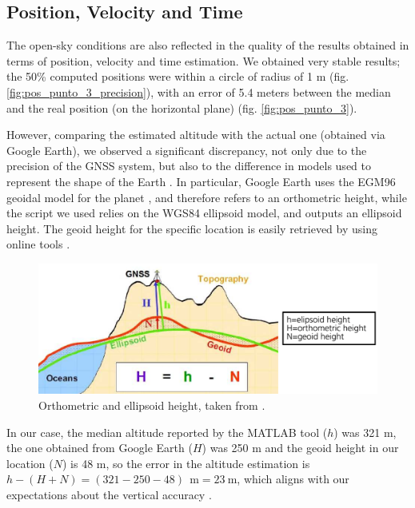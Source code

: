 \subsection{Position, Velocity and Time}
The open-sky conditions are also reflected in the quality of the results obtained in terms of position, velocity and time estimation. We obtained very stable results; the 50\% computed positions were within a circle of radius of 1 m (fig. \ref{fig:pos_punto_3_precision}), with an error of 5.4 meters between the median and the real position (on the horizontal plane) (fig. \ref{fig:pos_punto_3}). 

However, comparing the estimated altitude with the actual one (obtained via Google Earth), we observed a significant discrepancy, not only due to the precision of the GNSS system, but also to the difference in models used to represent the shape of the Earth \cite{esriGeoidArticle} \cite{eosElevation2025}. In particular, Google Earth uses the EGM96 geoidal model for the planet \citep{googleEarthModel} \citep{googleEarthModel2}, and therefore refers to an orthometric height, while the script we used relies on the WGS84 ellipsoid model, and outputs an ellipsoid height. The geoid height for the specific location is easily retrieved by using online tools \cite{geoidHeightCalculator}. 

\begin{figure}[H]
    \centering
    \includegraphics[width=0.50
    \linewidth]{images/geoidellipsoid_legenda.png}
    \caption{Orthometric and ellipsoid height, taken from \cite{kaminskis2008quasigeoid}.}
    \label{fig:h=H+N}
\end{figure}

In our case, the median altitude  reported by the MATLAB tool ($h$) was 321 m, the one obtained from Google Earth ($H$) was 250 m and the geoid height in our location ($N$) is 48 m, so the error in the altitude estimation is $h - (H + N) = (321 - 250 - 48)\ \SI{}{\meter}= \SI{23}{\meter}$, which aligns with our expectations about the vertical accuracy \cite{Enge2010-uj}.





